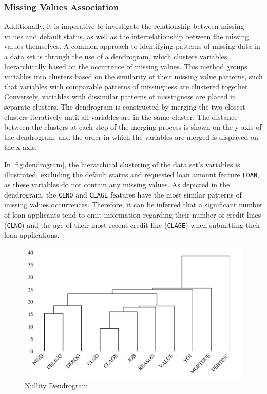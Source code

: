 \subsubsection{Missing Values Association}
Additionally, it is imperative to investigate the relationship between missing values and default status, as well as the interrelationship between the missing values themselves.
A common approach to identifying patterns of missing data in a data set is through the use of a dendrogram, which clusters variables hierarchically based on the occurrence of missing values.
This method groups variables into clusters based on the similarity of their missing value patterns, such that variables with comparable patterns of missingness are clustered together.
Conversely, variables with dissimilar patterns of missingness are placed in separate clusters.
The dendrogram is constructed by merging the two closest clusters iteratively until all variables are in the same cluster.
The distance between the clusters at each step of the merging process is shown on the y-axis of the dendrogram, and the order in which the variables are merged is displayed on the x-axis.

In \autoref{fig:dendrogram}, the hierarchical clustering of the data set's variables is illustrated, excluding the default status and requested loan amount feature \texttt{LOAN}, as these variables do not contain any missing values.
As depicted in the dendrogram, the \texttt{CLNO} and \texttt{CLAGE} features have the most similar patterns of missing values occurrences.
Therefore, it can be inferred that a significant number of loan applicants tend to omit information regarding their number of credit lines (\texttt{CLNO}) and the age of their most recent credit line (\texttt{CLAGE}) when submitting their loan applications.

\begin{figure}[H]
    \centering
    \caption{Nullity Dendrogram}\vspace{0.5em}
    \label{fig:dendrogram}
    \includegraphics[width=140mm]{Figures/NA_Dendrogram.jpg}
    \vspace{-1em}
\end{figure}

